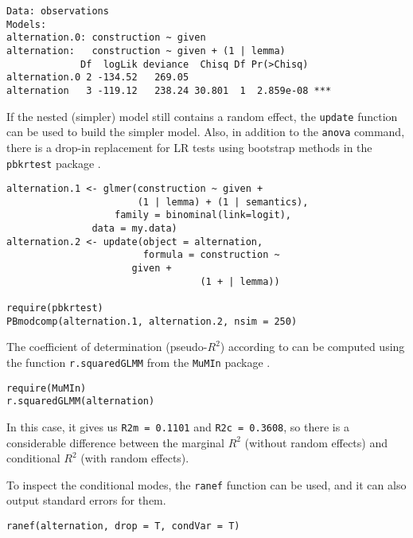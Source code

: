 \begin{lstlisting}
Data: observations
Models:
alternation.0: construction ~ given
alternation:   construction ~ given + (1 | lemma)
             Df  logLik deviance  Chisq Df Pr(>Chisq)    
alternation.0 2 -134.52   269.05                         
alternation   3 -119.12   238.24 30.801  1  2.859e-08 ***
\end{lstlisting}

If the nested (simpler) model still contains a random effect, the \texttt{update} function can be used to build the simpler model.
Also, in addition to the \texttt{anova} command, there is a drop-in replacement for LR tests using bootstrap methods in the \texttt{pbkrtest} package \citep{HalekohHojsgaard2014}.

\vspace{0.5\baselineskip}

\begin{lstlisting}
alternation.1 <- glmer(construction ~ given +
                       (1 | lemma) + (1 | semantics),
	               family = binominal(link=logit),
		       data = my.data)
alternation.2 <- update(object = alternation,
                        formula = construction ~
			          given +
                                  (1 + | lemma))

require(pbkrtest)
PBmodcomp(alternation.1, alternation.2, nsim = 250)
\end{lstlisting}

The coefficient of determination (pseudo-$R^2$) according to \citet{NakagawaSchielzeth2013} can be computed using the function \texttt{r.squaredGLMM} from the \texttt{MuMIn} package \citep{Barton2016}.

\vspace{0.5\baselineskip}

\begin{lstlisting}
require(MuMIn)
r.squaredGLMM(alternation)
\end{lstlisting}

In this case, it gives us \texttt{R2m = 0.1101} and \texttt{R2c = 0.3608}, so there is a considerable difference between the marginal $R^2$ (without random effects) and conditional $R^2$ (with random effects).

To inspect the conditional modes, the \texttt{ranef} function can be used, and it can also output standard errors for them.

\vspace{0.5\baselineskip}

\begin{lstlisting}
ranef(alternation, drop = T, condVar = T)
\end{lstlisting}


